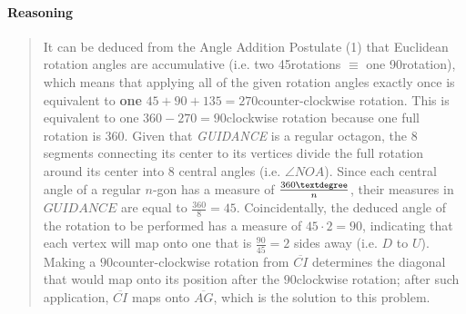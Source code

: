 \documentclass[letterpaper,12pt,twoside]{report}
\begin{document}
	\paragraph{Reasoning}
	\begin{quotation}
	
	It can be deduced from the Angle Addition Postulate (1) that Euclidean rotation angles are accumulative (i.e. two 45\textdegree \space rotations $\equiv$ one 90\textdegree \space rotation), which means that applying all of the given rotation angles exactly once is equivalent to \textbf{one} $45+90+135=270$\textdegree \space counter-clockwise rotation. This is equivalent to one $360-270=90$\textdegree \space clockwise rotation because one full rotation is $360$\textdegree. Given that \textit{GUIDANCE} is a regular octagon, the 8 segments connecting its center to its vertices divide the full rotation around its center into 8 central angles (i.e. $\angle NOA$). Since each central angle of a regular $n$-gon has a measure of $\frac{360\textdegree}{n}$, their measures in $GUIDANCE$ are equal to $\frac{360}{8}=45$\textdegree. Coincidentally, the deduced angle of the rotation to be performed has a measure of $45\cdot2=90$\textdegree, indicating that each vertex will map onto one that is $\frac{90}{45}=2$ sides away (i.e. $D$ to $U$). Making a $90$\textdegree \space counter-clockwise rotation from $\overline{CI}$ determines the  diagonal that would map onto its position after the $90$\textdegree \space clockwise rotation; after such application, $\overline{CI}$ maps onto $\boxed{\overline{AG}}$, which is the solution to this problem.
	
	\end{quotation}
	
	\iffalse
	
	\paragraph{External References}
	
	\begin{enumerate}
		\item Textbook Ch. 9, Pg. 589: Area of Parallelograms
		\item Textbook Ch. 9, Pg. 590: Area of Triangles and Trapezoids
	\end{enumerate}
	\fi
\end{document}
